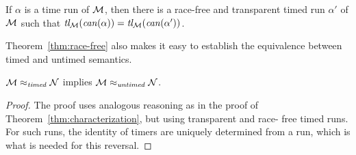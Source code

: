 \begin{theorem}
  \label{thm:race-free}
  If $\alpha$ is a time run of ${\mathcal M}$, then there is
  a race-free and transparent timed run $\alpha'$ of ${\mathcal M}$ such that
  $\mbox{\it tl}_{{\mathcal M}}({\mathit{can}({\alpha})}) = \mbox{\it tl}_{{\mathcal M}}({\mathit{can}({\alpha'})})$.
\end{theorem}

Theorem~\ref{thm:race-free} also makes it easy to establish the equivalence
between timed and untimed semantics.

\begin{theorem}
\label{timedimpliesuntimed}
${\mathcal M} \approx_{\mathit{timed}} {\mathcal N}$
implies
${\mathcal M} \approx_{\mathit{untimed}} {\mathcal N}$.
\end{theorem}

\begin{proof}
  The proof uses analogous reasoning as in the proof of
  Theorem~\ref{thm:characterization}, but using transparent and race-
  free timed runs. For such runs, the identity of timers are uniquely
  determined from a run, which is what is needed for this reversal.
\end{proof}












